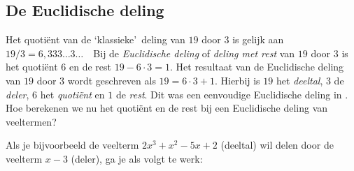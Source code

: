 \documentclass{ximera}
\begin{document}
    \author{Zomercursus KU Leuven}
    

\subsection{De Euclidische deling}\label{M01_euclidische deling}
Het quoti\"{e}nt van de \lq klassieke\rq\ deling van $19$ door $3$
is gelijk aan $19/3=6,333\ldots3\ldots$\ \ Bij de
\emph{Euclidische deling} of \emph{deling met rest} van $19$ door
$3$ is het quoti\"{e}nt $6$ en de rest $19-6\cdot3=1$. Het
resultaat van de Euclidische deling van $19$ door $3$ wordt
geschreven als $19=6\cdot3+1$. Hierbij is $19$ het \emph{deeltal},
$3$ de \emph{deler}, $6$ het \emph{quoti\"ent} en $1$ de
\emph{rest}. Dit was een eenvoudige Euclidische deling in \N. Hoe
berekenen we nu het quoti\"{e}nt en de rest bij een Euclidische
deling van veeltermen?

Als je bijvoorbeeld de veelterm $2x^3+x^2-5x+2$ (deeltal) wil
delen door de veelterm $x-3$ (deler), ga je als volgt te werk:

\vspace{.5cm}
\end{document}
